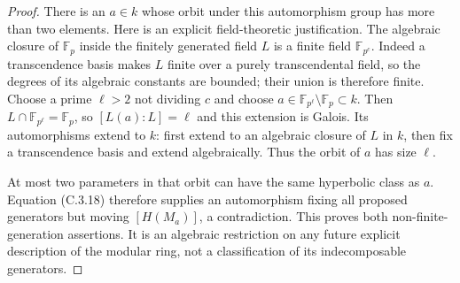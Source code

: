 \begin{proof}
There is an $a\in k$ whose orbit under this automorphism group
has more than two elements. Here is an explicit field-theoretic
justification. The algebraic closure of $\mathbb F_p$ inside the
finitely generated field $L$ is a finite field $\mathbb F_{p^c}$.
Indeed a transcendence basis makes $L$ finite over a purely
transcendental field, so the degrees of its algebraic constants
are bounded; their union is therefore finite. Choose a prime
$\ell>2$ not dividing $c$ and choose
$a\in\mathbb F_{p^\ell}\setminus\mathbb F_p\subset k$.
Then $L\cap\mathbb F_{p^\ell}=\mathbb F_p$, so
$[L(a):L]=\ell$ and this extension is Galois. Its automorphisms
extend to $k$: first extend to an algebraic closure of $L$ in
$k$, then fix a transcendence basis and extend algebraically.
Thus the orbit of $a$ has size $\ell$.

At most two parameters in that orbit can have the same hyperbolic
class as $a$. Equation (C.3.18) therefore supplies an automorphism
fixing all proposed generators but moving $[H(M_a)]$, a contradiction.
This proves both non-finite-generation assertions. It is an
algebraic restriction on any future explicit description of the
modular ring, not a classification of its indecomposable generators.
\end{proof}
